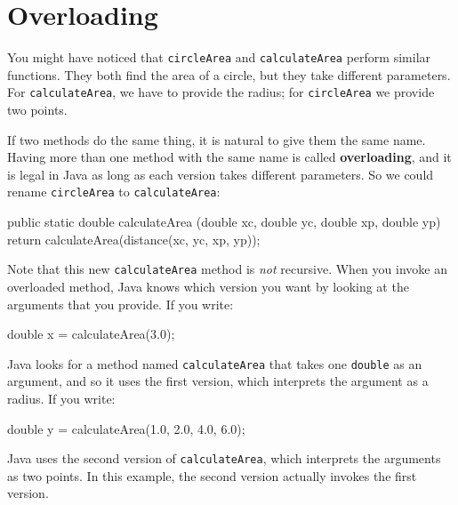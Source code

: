 \documentclass[12pt]{book}
\theoremstyle{exercise}
\newcommand{\java}[1]{\verb"#1"}
\begin{document}


\section{Overloading}
\label{overloading}

You might have noticed that \java{circleArea} and \java{calculateArea} perform similar functions.
They both find the area of a circle, but they take different parameters.
For \java{calculateArea}, we have to provide the radius; for \java{circleArea} we provide two points.


If two methods do the same thing, it is natural to give them the same name.
Having more than one method with the same name is called {\bf overloading}, and it is legal in Java as long as each version takes different parameters.
So we could rename \java{circleArea} to \java{calculateArea}:

\begin{code}
    public static double calculateArea
            (double xc, double yc, double xp, double yp) {
        return calculateArea(distance(xc, yc, xp, yp));
    }
\end{code}

Note that this new \java{calculateArea} method is {\em not} recursive.
When you invoke an overloaded method, Java knows which version you want by looking at the arguments that you provide.
If you write:

\begin{code}
    double x = calculateArea(3.0);
\end{code}

Java looks for a method named \java{calculateArea} that takes one \java{double} as an argument, and so it uses the first version, which interprets the argument as a radius.
If you write:

\begin{code}
    double y = calculateArea(1.0, 2.0, 4.0, 6.0);
\end{code}

Java uses the second version of \java{calculateArea}, which interprets the arguments as two points.
In this example, the second version actually invokes the first version.
\end{document}
